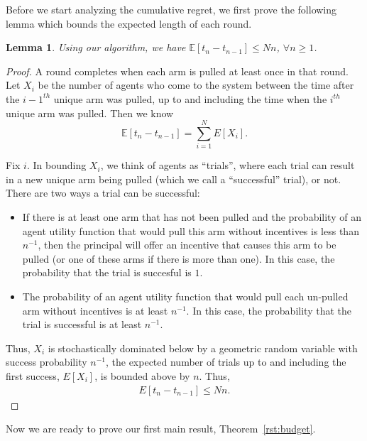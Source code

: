 \documentclass{article}
\newtheorem{lemma}{Lemma}
\begin{document}
Before we start analyzing the cumulative regret, we first prove the following lemma which bounds the expected length of each round.

\begin{lemma}
Using our algorithm, we have $\mathbb{E}[t_{n}-t_{n-1}]\leq Nn$, $\forall n\geq 1$.
\label{round:length}
\end{lemma}


\begin{proof}
	A round completes when each arm is pulled at least once in that round. Let $X_{i}$ be the number of agents who come to the system between the time after the $i-1^{th}$ unique arm was pulled, up to and including the time when the $i^{th}$ unique arm was pulled. Then we know 
\begin{equation*}
\mathbb{E}[t_{n}-t_{n-1}]=\sum_{i=1}^{N}E[X_{i}].
\end{equation*}


Fix $i$. In bounding $X_i$, we think of agents as ``trials'', where each trial can result in a new unique arm being pulled (which we call a ``successful'' trial), or not.  There are two ways a trial can be successful:
\begin{itemize}
\item If there is at least one arm that has not been pulled and the probability of an agent utility function that would pull this arm without incentives is less than $n^{-1}$, then the principal will offer an incentive that causes this arm to be pulled (or one of these arms if there is more than one). In this case, the probability that the trial is succesful is $1$.  
\item The probability of an agent utility function that would pull each un-pulled arm without incentives is at least $n^{-1}$. In this case, the probability that the trial is successful is at least $n^{-1}$.
\end{itemize}

Thus, $X_{i}$ is stochastically dominated below by a geometric random variable with success probability $n^{-1}$, the expected number of trials up to and including the first success, $E[X_i]$, is bounded above by $n$.  Thus,
\begin{align}
E[t_{n}-t_{n-1}]\leq Nn. \nonumber
\end{align}
\end{proof}


Now we are ready to prove our first main result, Theorem~\ref{rst:budget}.
\end{document}
